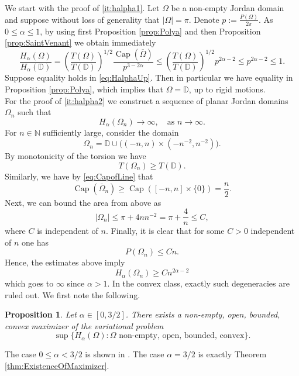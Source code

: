 \documentclass[11pt]{article}
\theoremstyle{plain}
\numberwithin{equation}{section}
\newtheorem{proposition}[theorem]{Proposition}
\theoremstyle{definition}
\let\oldendproof\endproof
\renewenvironment{proof}[1][\proofname]{%
\oldproof[\upshape \bfseries #1]%
}{\oldendproof}
\DeclareMathOperator{\cp}{Cap}
\def \Om{\Omega}
\def \mb{\mathbb}
\begin{document}
    \begin{proof}
        We start with the proof of \ref{it:halpha1}. Let $\Om$ be a non-empty Jordan domain and suppose without loss of generality that $|\Om|=\pi$. Denote $p:=\frac{P(\Om)}{2\pi}$. As $0\leq \alpha \leq 1$, by using first Proposition \ref{prop:Polya} and then Proposition \ref{prop:SaintVenant} we obtain immediately
        \begin{equation}
            \label{eq:HalphaUp}
            \frac{H_\alpha(\Om)}{H_\alpha(\mb D)}=\left(\frac{T(\Om)}{T(\mb D)}\right)^{1/2}\frac{\cp(\overline \Om)}{p^{3-2\alpha}} \leq \left(\frac{T(\Om)}{T(\mb D)}\right)^{1/2}p^{2\alpha-2}\leq p^{2\alpha-2}\leq 1.
        \end{equation}
        Suppose equality holds in \eqref{eq:HalphaUp}. Then in particular we have equality in Proposition \ref{prop:Polya}, which implies that $\Om =\mb D$, up to rigid motions.\\
        For the proof of \ref{it:halpha2} we construct a sequence of planar Jordan domains $\Om_n$ such that
        \[
        H_\alpha(\Om_n)\to \infty,\quad \text{as }n \to \infty.
        \]
        For $n\in \mb N$ sufficiently large, consider the domain
        \[
        \Om_n=\mb D\cup \big((-n,n)\times(-n^{-2},n^{-2})\big).
        \]
        By monotonicity of the torsion we have
        \[
        T(\Om_n)\geq T(\mb D).
        \]
        Similarly, we have by \eqref{eq:CapofLine} that
        \[
        \cp(\overline \Om_n)\geq \cp([-n,n]\times \{0\})=\frac n2.
        \]
        Next, we can bound the area from above as
        \[
        |\Om_n|\leq  \pi +4 nn^{-2}=\pi+\frac{4}{n}\leq C,
        \]
        where $C$ is independent of $n$. Finally, it is clear that for some $C>0$ independent of $n$ one has
        \[
        P(\Om_n)\leq Cn.
        \]
        Hence, the estimates above imply
        \[
        H_\alpha(\Om_n)\geq C n^{2\alpha-2}
        \]
        which goes to $\infty$ since $\alpha>1$.
    \end{proof}
    In the convex class, exactly such degeneracies are ruled out. We first note the following.
    \begin{proposition}
        \label{prop:existenceMaxHalpha}
        Let $\alpha \in [0,3/2]$. There exists a non-empty, open, bounded, convex maximizer of the variational problem
        \[
        \sup\{H_\alpha(\Om): \Om \text{ non-empty, open, bounded, convex}\}.
        \]
    \end{proposition}

    \begin{proof}
        The case $0\leq \alpha < 3/2$ is shown in \cite[Theorem 7 (iii)]{van2023some}. The case $\alpha =3/2$ is exactly Theorem \ref{thm:ExistenceOfMaximizer}.
    \end{proof}
    
\end{document}

